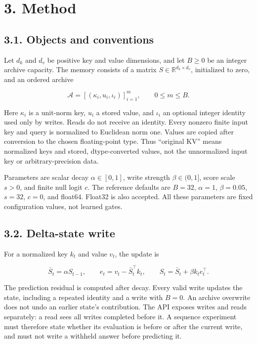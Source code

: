 \documentclass[11pt,a4paper]{article}
\begin{document}
\section{3. Method}\label{method}

\subsection{3.1. Objects and conventions}\label{objects-and-conventions}

Let \(d_k\) and \(d_v\) be positive key and value dimensions, and let \(B\geq0\) be an integer archive capacity. The memory consists of a matrix \(S\in\mathbb{R}^{d_k\times d_v}\), initialized to zero, and an ordered archive

\nopagebreak[4]

\[
\mathcal A=[(\kappa_i,u_i,\iota_i)]_{i=1}^{m},\qquad 0\leq m\leq B.
\]

Here \(\kappa_i\) is a unit-norm key, \(u_i\) a stored value, and \(\iota_i\) an optional integer identity used only by writes. Reads do not receive an identity. Every nonzero finite input key and query is normalized to Euclidean norm one. Values are copied after conversion to the chosen floating-point type. Thus ``original KV'' means normalized keys and stored, dtype-converted values, not the unnormalized input key or arbitrary-precision data.

Parameters are scalar decay \(\alpha\in[0,1]\), write strength \(\beta\in(0,1]\), score scale \(s>0\), and finite null logit \(c\). The reference defaults are \(B=32\), \(\alpha=1\), \(\beta=0.05\), \(s=32\), \(c=0\), and float64. Float32 is also accepted. All these parameters are fixed configuration values, not learned gates.

\subsection{3.2. Delta-state write}\label{delta-state-write}

For a normalized key \(k_t\) and value \(v_t\), the update is

\nopagebreak[4]

\[
\bar S_t=\alpha S_{t-1},\qquad
e_t=v_t-\bar S_t^{\top}k_t,\qquad
S_t=\bar S_t+\beta k_te_t^{\top}. \tag{1}
\]

The prediction residual is computed after decay. Every valid write updates the state, including a repeated identity and a write with \(B=0\). An archive overwrite does not undo an earlier state's contribution. The API exposes writes and reads separately: a read sees all writes completed before it. A sequence experiment must therefore state whether its evaluation is before or after the current write, and must not write a withheld answer before predicting it.
\end{document}
